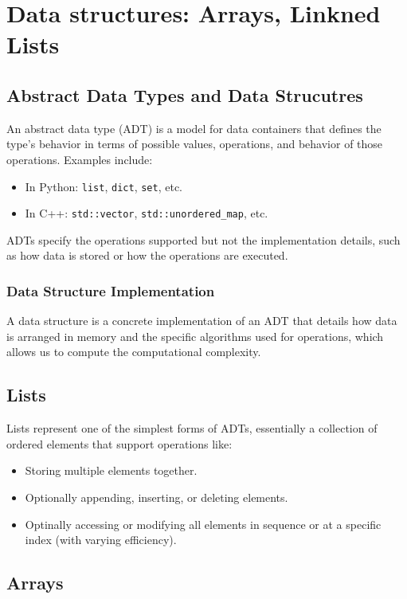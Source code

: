 \documentclass[12pt]{article}
\begin{document}
\newpage
\section{Data structures: Arrays, Linkned Lists}

\subsection{Abstract Data Types and Data Strucutres}

An abstract data type (ADT) is a model for data containers that defines the type's behavior in terms of possible values, operations, and behavior of those operations. Examples include:

\begin{itemize}
    \item In Python: \texttt{list}, \texttt{dict}, \texttt{set}, etc.
    \item In C++: \texttt{std::vector}, \texttt{std::unordered\_map}, etc.
\end{itemize}

ADTs specify the operations supported but not the implementation details, such as how data is stored or how the operations are executed.

\subsubsection{Data Structure Implementation}
A data structure is a concrete implementation of an ADT that details how data is arranged in memory and the specific algorithms used for operations, which allows us to compute the computational complexity.


\subsection{Lists}
Lists represent one of the simplest forms of ADTs, essentially a collection of ordered elements that support operations like:
\begin{itemize}
    \item Storing multiple elements together.
    \item Optionally appending, inserting, or deleting elements.
    \item Optinally accessing or modifying all elements in sequence or at a specific index (with varying efficiency).
\end{itemize}

\subsection{Arrays}
\end{document}
